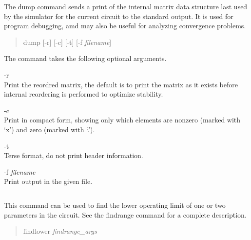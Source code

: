 
The {\cb dump} command sends a print of the internal matrix data
structure last used by the simulator for the current circuit to the
standard output.  It is used for program debugging, amd may also be
useful for analyzing convergence problems.

\begin{quote}
{\vt dump} [{\vt -r}] [{\vt -c}] [{\vt -t}] [{\vt -f} {\it filename\/}]
\end{quote}

The command takes the following optional arguments.
\begin{description} 
\item{\vt -r}\\
Print the reordred matrix, the default is to print the matrix as it
exists before internal reordering is performed to optimize stability.

\item{\vt -c}\\
Print in compact form, showing only which elements are nonzero (marked
with `x') and zero (marked with `.').

\item{-t}\\
Terse format, do not print header information.

\item{\vt -f} {\it filename}\\
Print output in the given file.
\end{description}

\subsection{}


This command can be used to find the lower operating limit of one or
two parameters in the circuit.  See the {\cb findrange} command for a
complete description.

\begin{quote}
{\vt findlower} {\it findrange\_args}
\end{quote}

\subsection{}

